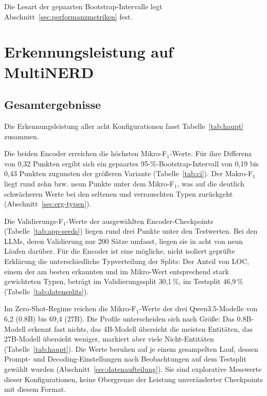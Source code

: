 Die Lesart der gepaarten Bootstrap-Intervalle legt
Abschnitt~\ref{sec:performanzmetriken} fest.

\section{Erkennungsleistung auf MultiNERD}
\label{sec:erg-leistung}

\subsection{Gesamtergebnisse}
\label{sec:erg-gesamt}

Die Erkennungsleistung aller acht Konfigurationen fasst
Tabelle~\ref{tab:haupt} zusammen.

\begin{table}[htbp]
  \centering
  \small
  \caption[Erkennungsleistung aller Konfigurationen auf dem MultiNERD-Testsplit]{Erkennungsleistung aller Konfigurationen auf dem englischen
  MultiNERD-Testsplit (strikte Werte auf Entitätsebene, IOB2, in Punkten).
  Trainierte Konfigurationen: Mittelwert~$\pm$~Stichprobenstandardabweichung
  über drei Seeds; Zero-Shot: Einzellauf mit Sampling.
  Makro-F$_1$: ungewichtetes Mittel der typbezogenen F$_1$-Werte über
  15 Typen.
  Seed-Einzelwerte in Tabelle~\ref{tab:app-seeds}.}
  \label{tab:haupt}
  \setlength{\tabcolsep}{4pt}
  
\end{table}

Die beiden Encoder erreichen die höchsten Mikro-F$_1$-Werte.
Für ihre Differenz von 0,32 Punkten ergibt sich ein gepaartes
95-\%-Bootstrap-Intervall von 0,19 bis 0,43 Punkten zugunsten der
größeren Variante (Tabelle~\ref{tab:ci}).
Der Makro-F$_1$ liegt rund zehn bzw. neun Punkte unter dem Mikro-F$_1$,
was auf die deutlich schwächeren Werte bei den seltenen und verrauschten
Typen zurückgeht (Abschnitt~\ref{sec:erg-typen}).

Die Validierungs-F$_1$-Werte der ausgewählten Encoder-Checkpoints
(Tabelle~\ref{tab:app-seeds}) liegen rund drei Punkte unter den
Testwerten. Bei den LLMs, deren Validierung nur 200 Sätze umfasst,
liegen sie in acht von neun Läufen darüber.
Für die Encoder ist eine mögliche, nicht isoliert geprüfte Erklärung die
unterschiedliche Typverteilung der Splits: Der Anteil von LOC, einem der
am besten erkannten und im Mikro-Wert entsprechend stark gewichteten
Typen, beträgt im Validierungssplit 30,1\,\%, im Testsplit 46,9\,\%
(Tabelle~\ref{tab:datensplits}).

Im Zero-Shot-Regime reichen die Mikro-F$_1$-Werte der drei
Qwen3.5-Modelle von 6,2 (0.8B) bis 69,4 (27B).
Die Profile unterscheiden sich nach Größe: Das 0.8B-Modell erkennt fast
nichts, das 4B-Modell übersieht die meisten Entitäten, das 27B-Modell
übersieht weniger, markiert aber viele Nicht-Entitäten
(Tabelle~\ref{tab:haupt}).
Die Werte beruhen auf je einem gesampelten Lauf, dessen Prompt- und
Decoding-Einstellungen nach Beobachtungen auf dem Testsplit gewählt
wurden (Abschnitt~\ref{sec:datenaufteilung}). Sie sind explorative Messwerte
dieser Konfigurationen, keine Obergrenze der Leistung unveränderter
Checkpoints mit diesem Format.

